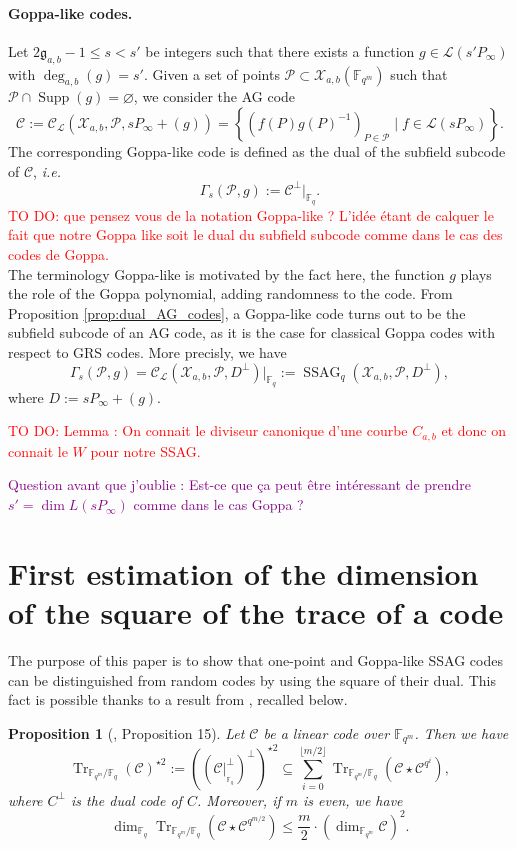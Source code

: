 \documentclass[a4paper]{article}
\newtheorem{proposition}[thm]{Proposition}
\theoremstyle{definition}
\theoremstyle{remark}
\newcommand{\calP}{\mathcal{P}}
\newcommand{\calL}{\mathcal{L}}
\newcommand{\calC}{\mathcal{C}}
\newcommand{\calX}{\mathcal{X}}
\newcommand{\fqm}{\mathbb{F}_{q^m}}
\newcommand{\fq}{\mathbb{F}_{q}}
\newcommand{\F}{\mathbb{F}}
\newcommand{\Tr}[1]{\operatorname{Tr}_{\mathbb{F}_{q^m}/\fq}\left(#1\right)}
\newcommand{\set}[1]{\left\{#1\right\}}
\newcommand{\Supp}{\operatorname{Supp}}
\newcommand{\ssag}[1]{\operatorname{SSAG}_{q}\left(#1\right)}
\newcommand{\degab}[1]{\deg_{a,b}\left(#1\right)}
\newcommand\jade[1]{\textcolor{purple}{#1}}
\newcommand\TODO[1]{\textcolor{red}{TO DO: #1}}
\begin{document}
\paragraph{Goppa-like codes.} Let $2\mathfrak{g}_{a,b}-1 \leq s<s'$ be integers such that there exists a function $g \in \calL(s'P_\infty)$ with $\degab{g}=s'$. Given a set of points  $\calP \subset \calX_{a,b}(\F_{q^m})$ such that $\calP \cap \Supp(g) = \varnothing$, we consider the AG code 
\[\calC := \calC_{\calL}(\calX_{a,b},\calP,sP_\infty+(g))=\set{\left(f(P)g(P)^{-1}\right)_{P \in \calP} \mid f \in \calL(sP_\infty)}.\]
The corresponding Goppa-like code is defined as the dual of the subfield subcode of $\calC$, \emph{i.e.}
$$ \Gamma_s(\calP,g) := \calC^{\perp}|_{\fq}.$$
\TODO{que pensez vous de la notation Goppa-like ? L'idée étant de calquer le fait que notre Goppa like soit le dual du subfield subcode comme dans le cas des codes de Goppa.}\\
\noindent The terminology Goppa-like is motivated by the fact here, the function $g$ plays the role of the Goppa polynomial, adding randomness to the code. From Proposition \ref{prop:dual_AG_codes}, a Goppa-like code turns out to be the subfield subcode of an AG code, as it is the case for classical Goppa codes with respect to GRS codes. More precisly, we have 
$$ \Gamma_s(\calP,g) = \calC_{\calL}(\calX_{a,b},\calP,D^{\perp})|_{\fq} := \ssag{\calX_{a,b},\calP,D^{\perp}},$$
where $D := sP_{\infty}+(g)$. 


\TODO{Lemma : On connait le diviseur canonique d'une courbe $C_{a,b}$ et donc on connait le $W$ pour notre SSAG.}

\jade{Question avant que j'oublie : Est-ce que ça peut être intéressant de prendre $s'=\dim L(sP_\infty)$ comme dans le cas Goppa ?}


\section{First estimation of the dimension of the square of the trace of a code}

The purpose of this paper is to show that one-point and Goppa-like SSAG codes   can be distinguished from random codes by using the square of their dual. This fact is possible thanks to a result from \cite{MT21}, recalled below.

\begin{proposition}[\cite{MT21}, Proposition 15] \label{prop:Tr_BoundSchurSquare}
Let $\calC$ be a linear code over $\fqm$. Then we have 
\begin{equation} \label{eq:key_equation} \Tr{\calC}^{\star2} := ((\calC|^{\perp}_{_{{\mathbb{F}_q}}})^{\perp})^{\star2} \subseteq \sum\limits_{i=0}^{\lfloor{m/2} \rfloor} \Tr{\calC\star \calC^{q^i}},
\end{equation}
where $C^{\perp}$ is the dual code of $C$. %
Moreover, if $m$ is even, we have 
\[\dim_{\mathbb{F}_q}\Tr{ \calC \star \calC^{q^{m/2}}} \leq \frac{m}{2}\cdot \left(\dim_{\fqm}\calC\right)^2.\]
\end{proposition}
\end{document}
